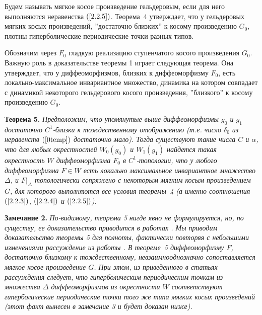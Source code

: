 \documentclass[12pt]{article}
\begin{document}
Будем называть мягкое косое произведение гельдеровым, если для него выполняются неравенства $(\ref{2.2.5})$. Теорема~4 утверждает, что у гельдеровых мягких косых произведений, ''достаточно близких'' к косому произведению $G_0$, плотны гиперболические периодические точки разных типов. 

Обозначим через $F_0$ гладкую реализацию ступенчатого косого произведения $G_0$. Важную роль в доказательстве теоремы 1 играет следующая теорема. Она утверждает, что у диффеоморфизмов, близких к диффеоморфизму $F_0$, есть локально-максимальное инвариантное множество, динамика на котором совпадает с динамикой некоторого гельдерового косого произведения, ''близкого'' к косому произведению $G_0$.

\textbf{Теорема 5.}
\textit{
 Предположим, что упомянутые выше диффеоморфизмы $g_0$ и $g_1$ достаточно $C^1$-близки к тождественному отображению (т.е. число $\delta_0$ из неравенств $(\ref{0temp})$ достаточно ма\nobreak ло). 
Тогда существуют такие числа $C$ и $\alpha$, что для любых окрестностей $W_0(g_0)$ и $W_1(g_1)$ найдется такая окрестность $W$ диффеоморфизма $F_0$ в $C^1$-топологии, что у любого диффеоморфизма $F\in W$ есть локально максимальное инвариантное множество $\Delta$, и $F|_{\Delta}$ топологически сопряжено с некоторым мягким косым произведением $G$, для которого выполняются все условия теоремы~4 (а именно соотношения $(\ref{2.2.3})$, $(\ref{2.2.4})$ и $(\ref{2.2.5})$).
}

\textbf{Замечание 2.}
\textit{
 По-видимому, теорема 5 нигде явно не формулируется, но, по существу, ее доказательство приводится в работах \cite{18,12,14}. Мы приводим доказательство теоремы 5 для полноты, фактически повторяя с небольшими изменениями рассуждение из работы \cite{18}.
В теореме~5  диффеоморфизму $F$, достаточно близкому к тождественному, невзаимнооднозначно сопоставляется мягкое косое произведение $G$. %
При этом, из приведенного в статьях \cite{12,14} рассуждения следует, что
гиперболическим периодическим точкам из множества $\Delta$ диффеоморфизмов из окрестности $W$ соответствуют гиперболические периодические точки  того же типа мягких косых произведений (этот факт вынесен в замечание 3 и будет доказан ниже).}
\end{document}
